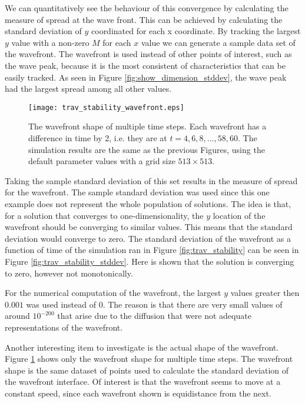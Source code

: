 We can quantitatively see the behaviour of this convergence by calculating the measure of spread at the wave front.
This can be achieved by calculating the standard deviation of $y$ coordinated for each x coordinate.
By tracking the largest $y$ value with a non-zero $M$ for each $x$ value we can generate a sample data set of the wavefront.
The wavefront is used instead of other points of interest, such as the wave peak, because it is the most consistent of characteristics that can be easily tracked.
As seen in Figure \ref{fig:show_dimension_stddev}, the wave peak had the largest spread among all other values. 

\begin{figure}[!htp]
  \centering
  \texttt{[image: trav\_stability\_wavefront.eps]}
  \caption{The wavefront shape of multiple time steps.
    Each wavefront has a difference in time by 2, i.e. they are at $t = 4, 6, 8, \ldots, 58, 60$. 
    The simulation results are the same as the previous Figures, using the default parameter values with a grid size $513 \times 513$.
    }
  \label{fig:trav_wavefront}
\end{figure}

Taking the sample standard deviation of this set results in the measure of spread for the wavefront.
The sample standard deviation was used since this one example does not represent the whole population of solutions.
The idea is that, for a solution that converges to one-dimensionality, the $y$ location of the wavefront should be converging to similar values.
This means that the standard deviation would converge to zero.
The standard deviation of the wavefront as a function of time of the simulation ran in Figure \ref{fig:trav_stability} can be seen in Figure \ref{fig:trav_stability_stddev}.
Here is shown that the solution is converging to zero, however not monotonically.

For the numerical computation of the wavefront, the largest $y$ values greater then $0.001$ was used instead of $0$.
The reason is that there are very small values of around $10^{-200}$ that arise due to the diffusion that were not adequate representations of the wavefront.

Another interesting item to investigate is the actual shape of the wavefront.
Figure \ref{fig:trav_wavefront} shows only the wavefront shape for multiple time steps.
The wavefront shape is the same dataset of points used to calculate the standard deviation of the wavefront interface.
Of interest is that the wavefront seems to move at a constant speed, since each wavefront shown is equidistance from the next.


